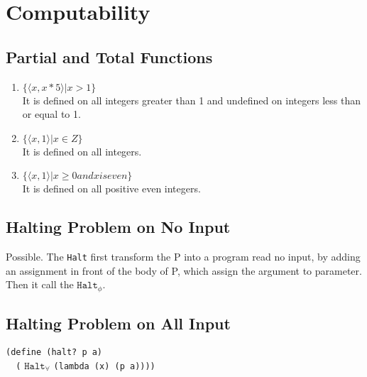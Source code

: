 \chapter{Computability}

\renewcommand{\theenumi}{(\alph{enumi})}

\section{Partial and Total Functions}
\begin{enumerate}
  \item
  $ \{ \langle x, x*5 \rangle | x > 1\} $ \\
  It is defined on all integers greater than 1 and 
  undefined on integers less than or equal to 1.
  
  \item 
  $ \{ \langle x, 1 \rangle | x \in Z \} $ \\
  It is defined on all integers.
  
  \item 
  $ \{ \langle x, 1 \rangle | x \ge 0 and x is even \} $ \\
  It is defined on all positive even integers.
\end{enumerate}


\section{Halting Problem on No Input}
Possible. The \texttt{Halt} first transform the P into a program 
read no input, by adding an assignment in front of the body of P, 
which assign the argument to parameter. Then it call the 
${\mathtt{Halt}}_{\phi}$.


\section{Halting Problem on All Input}
\verb+(define (halt? p a)+ \\
\verb+  (+ ${\mathtt{Halt}}_{\forall}$ \verb+(lambda (x) (p a))))+

